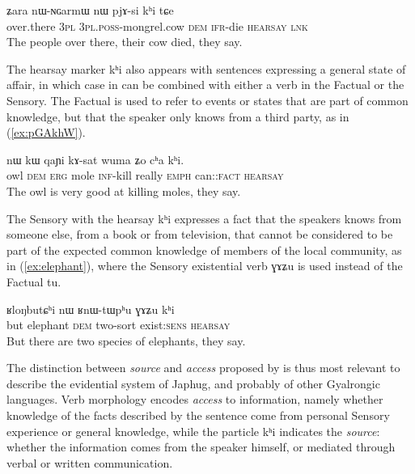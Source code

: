 \documentclass[oldfontcommands,oneside,a4paper,11pt]{article}
\newcommand{\ipa}[1]{{\phon \mbox{#1}}} %
\newcommand{\refb}[1]{(\ref{#1})}
\newcommand{\factual}[1]{\textsc{:fact}}
\begin{document}
\begin{exe}
\ex \label{ex:pjAsi2}
\gll \ipa{tɕɤtu} 	\ipa{ʑara} 	\ipa{nɯ-ɴɢarmɯ} 	\ipa{nɯ} 	\ipa{pjɤ-si} 	\ipa{kʰi} 	\ipa{tɕe} \\
over.there \textsc{3pl} \textsc{3pl.poss}-mongrel.cow  \textsc{dem} \textsc{ifr}-die \textsc{hearsay} \textsc{lnk} \\
\glt The people over there, their cow died, they say.
\end{exe} 
 
 The hearsay marker \ipa{kʰi} also appears with sentences expressing a general state of affair, in which case in can be combined with either a verb in the Factual or the Sensory. The Factual is used to refer to events or states that are part of common knowledge, but that the speaker only knows from a third party, as in \refb{ex:pGAkhW}.
 
 \begin{exe}
\ex \label{ex:pGAkhW}
\gll   \ipa{pɣɤkhɯ}  	\ipa{nɯ}  	\ipa{kɯ}  	\ipa{qaɲi}  	\ipa{kɤ-sat}  	\ipa{wuma}  	\ipa{ʑo}  	\ipa{cʰa} 	\ipa{kʰi.}  \\
owl \textsc{dem} \textsc{erg} mole \textsc{inf}-kill really \textsc{emph} can:\factual{} \textsc{hearsay} \\
\glt The owl is very good at killing moles, they say.
\end{exe} 
  
  The Sensory with the hearsay \ipa{kʰi} expresses a fact that the speakers knows from someone else, from  a book or from television, that cannot be considered to be part of the expected common knowledge of members of the local community, as in \refb{ex:elephant}, where the Sensory existential verb \ipa{ɣɤʑu} is used instead of the Factual \ipa{tu}.
  
   \begin{exe}
\ex \label{ex:elephant}
\gll   \ipa{tɕeri}  	\ipa{ʁloŋbutɕʰi}  	\ipa{nɯ}  	\ipa{ʁnɯ-tɯpʰu}  	\ipa{ɣɤʑu}  	\ipa{kʰi}  \\
  but elephant \textsc{dem} two-sort exist:\textsc{sens} \textsc{hearsay} \\
\glt But there are two species of elephants, they say.
\end{exe} 

The distinction between \textit{source} and \textit{access}  proposed by \citet{tournadre14evidentiality} is thus most relevant to describe the evidential system of Japhug, and probably of other Gyalrongic languages. Verb morphology encodes \textit{access} to information, namely whether knowledge of the facts described by the sentence come from personal Sensory experience or general knowledge, while the particle \ipa{kʰi} indicates the \textit{source}: whether the information comes from the speaker himself, or mediated through verbal or written communication.
\end{document}
